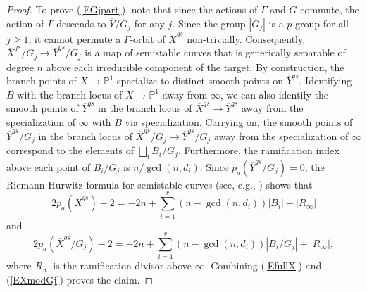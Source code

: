 \documentclass[12pt]{amsart}
\numberwithin{equation}{section}
\theoremstyle{definition}
\newcommand{\ol}[1]{\overline{#1}}
\newcommand{\proj}{\mathbb P}
\begin{document}
\begin{proof}
To prove (\ref{EGjpart}), note that since the actions of $\Gamma$ and $G$
commute, the action of $\Gamma$ descends to $\ol{Y}/G_j$
for any $j$.  Since the group $|G_j|$ is a $p$-group for all $j \geq 1$,
it cannot permute a $\Gamma$-orbit of
$\ol{X}^{qs}$ non-trivially.  Consequently, $\ol{X}^{qs}/G_j \to
\ol{Y}^{qs}/G_j$ is a map of semistable curves
that is generically separable of degree $n$ above each irreducible component of the target. 
By construction, the branch points of $X \to \proj^1$ specialize to
distinct smooth points on $\ol{Y}^{qs}$.  
Identifying $B$ with the branch locus of $X \to \proj^1$ away from $\infty$, we can also
identify the smooth
points of $\ol{Y}^{qs}$ in the branch locus of $\ol{X}^{qs} \to
\ol{Y}^{qs}$ away from the specialization of $\infty$ with $B$ via specialization.  Carrying on, the smooth points of $\ol{Y}^{qs}/G_j$
in the branch locus of $\ol{X}^{qs}/G_j \to \ol{Y}^{qs}/G_j$ away from
the specialization of $\infty$
correspond to the elements of 
$\bigsqcup_i B_i/G_j$.  Furthermore, the ramification index above each
point of $B_i/G_j$ is $n/\gcd(n, d_i)$.  Since $p_a(\ol{Y}^{qs}/G_j) = 0$, the
Riemann-Hurwitz formula for semistable curves (see, e.g.,
\cite[Proposition~2.15]{ObusThesis}) shows
that
\begin{equation}\label{EfullX}
2p_a(\ol{X}^{qs}) - 2 = -2n + 
\sum_{i=1}^r (n - \gcd(n, d_i)) |B_i| + |R_{\infty}|
\end{equation}
and
\begin{equation}\label{EXmodGj}
2p_a(\ol{X}^{qs}/G_j) - 2 = -2n + 
\sum_{i=1}^r (n - \gcd(n, d_i)) |B_i/G_j| + |R_{\infty}|, 
\end{equation}
where $R_{\infty}$ is the ramification divisor above $\infty$.
Combining (\ref{EfullX}) and (\ref{EXmodGj}) proves the claim.


\end{proof}
\end{document}
